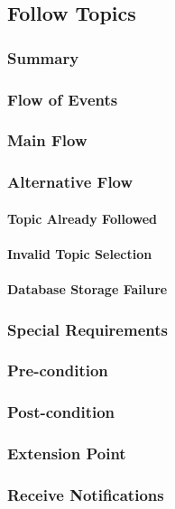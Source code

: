 \subsection{Follow Topics}
\subsubsection{Summary}

\subsubsection{Flow of Events}
\subsubsection*{Main Flow}

\subsubsection*{Alternative Flow}
\paragraph{Topic Already Followed}

\paragraph{Invalid Topic Selection}

\paragraph{Database Storage Failure}

\subsubsection{Special Requirements}

\subsubsection{Pre-condition}

\subsubsection{Post-condition}

\subsubsection{Extension Point}
\subsubsection*{Receive Notifications}
